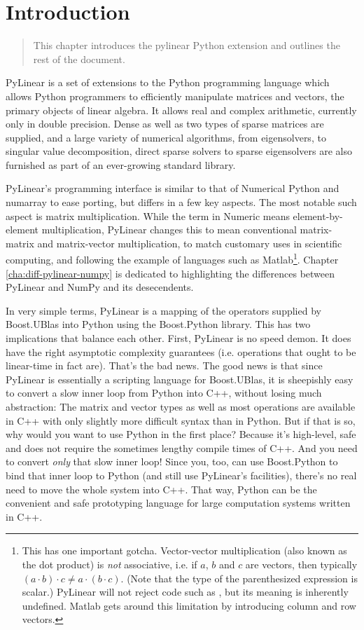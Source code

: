 \chapter{Introduction}
\label{cha:introduction}

\begin{quote}
   This chapter introduces the pylinear Python extension and outlines the rest
   of the document.
\end{quote}

PyLinear is a set of extensions to the Python programming language
which allows Python programmers to efficiently manipulate matrices and
vectors, the primary objects of linear algebra.  It allows real and
complex arithmetic, currently only in double precision.  Dense as well
as two types of sparse matrices are supplied, and a large variety of
numerical algorithms, from eigensolvers, to singular value
decomposition, direct sparse solvers to sparse eigensolvers are also
furnished as part of an ever-growing standard library.

PyLinear's programming interface is similar to that of Numerical
Python and numarray to ease porting, but differs in a few key
aspects. The most notable such aspect is matrix multiplication. While
the term  in Numeric means element-by-element
multiplication, PyLinear changes this to mean conventional
matrix-matrix and matrix-vector multiplication, to match customary
uses in scientific computing, and following the example of languages
such as Matlab\footnote{This has one important gotcha. Vector-vector
multiplication (also known as the dot product) is \emph{not}
associative, i.e. if $a$, $b$ and $c$ are vectors, then typically
$(a\cdot b)\cdot c\not=a\cdot(b\cdot c)$. (Note that the type of the
parenthesized expression is scalar.) PyLinear will not reject code
such as , but its meaning is inherently undefined. Matlab
gets around this limitation by introducing column and row vectors.}.
Chapter \ref{cha:diff-pylinear-numpy} is dedicated to highlighting the
differences between PyLinear and NumPy and its desecendents.

In very simple terms, PyLinear is a mapping of the operators supplied by
Boost.UBlas into Python using the Boost.Python library.  This has two
implications that balance each other. First, PyLinear is no speed demon. It
does have the right asymptotic complexity guarantees (i.e. operations that
ought to be linear-time in fact are). That's the bad news. The good news is
that since PyLinear is essentially a scripting language for Boost.UBlas, it is
sheepishly easy to convert a slow inner loop from Python into C++, without
losing much abstraction: The matrix and vector types as well as most operations
are available in C++ with only slightly more difficult syntax than in Python.
But if that is so, why would you want to use Python in the first place? Because
it's high-level, safe and does not require the sometimes lengthy compile times
of C++.  And you need to convert \emph{only} that slow inner loop!  Since you,
too, can use Boost.Python to bind that inner loop to Python (and still use
PyLinear's facilities), there's no real need to move the whole system into C++.
That way, Python can be the convenient and safe prototyping language for large
computation systems written in C++.
